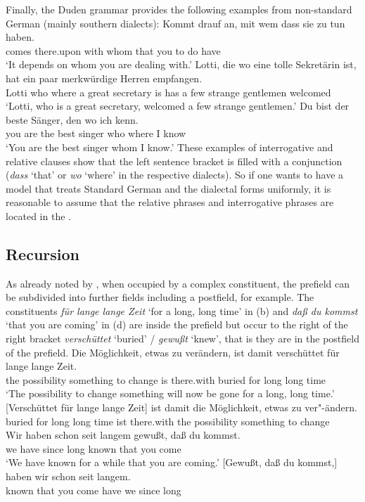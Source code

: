 {Finally, the Duden grammar \citep[§1347]{Duden2005-Authors} provides the following examples from non-standard German
(mainly southern dialects):
\eal
\ex 
\gll Kommt drauf an, mit wem dass sie zu tun haben.\\
     comes there.upon \partic{} with whom that you to do have\\
\glt `It depends on whom you are dealing with.'
\zl
\eal
\ex 
\gll Lotti, die wo eine tolle Sekretärin ist, hat ein paar merkwürdige Herren empfangen.\\
     Lotti  who where a great secretary is has a few strange gentlemen welcomed\\
\glt `Lotti, who is a great secretary, welcomed a few strange gentlemen.'
\ex 
\gll Du bist der beste Sänger, den wo ich kenn.\\
     you are the best singer   who where I know\\
\glt `You are the best singer whom I know.'
\zl
These examples of interrogative and relative clauses show that the left sentence bracket is filled
with a conjunction (\emph{dass} `that' or \emph{wo} `where' in the respective dialects). So if one wants to have a model that treats Standard German and the
dialectal forms uniformly, it is reasonable to assume that the relative phrases and interrogative phrases
are located in the \vf. 

\subsection{Recursion}
\label{sec-topo-rekursion}

As already noted by \citet[]{Reis80a}, when occupied by a complex constituent, the prefield can be subdivided into 
further fields including a postfield, for example. The constituents \emph{für lange lange Zeit} `for a long, long
time' in (b) and  \emph{daß du kommst} `that you are coming' in (d) are inside the prefield but occur
to the right of the right bracket \emph{verschüttet} `buried' / \emph{gewußt} `knew', that is they are in the postfield
of the prefield.
\eal
\label{Beispiel-topologisch-komplexes-Vorfeld}
\ex
\gll Die Möglichkeit, etwas zu verändern, ist damit verschüttet für lange lange Zeit.\\
	 the possibility something to change is there.with buried for long long time\\
\glt `The possibility to change something will now be gone for a long, long time.'	  
\ex 
\gll {}[Verschüttet für lange lange Zeit] ist damit die Möglichkeit,      etwas zu ver"-ändern.\\
      \spacebr{}buried for long long time ist there.with the possibility  something to change\\
\ex 
\gll Wir haben schon seit langem gewußt, daß du kommst.\\
     we have \particle{} since long known that you come\\
\glt `We have known for a while that you are coming.'
\ex 
\gll {}[Gewußt, daß du kommst,] haben wir schon seit langem.\\
	 \spacebr{}known that you come have we \particle{} since long\\
\zl


}
